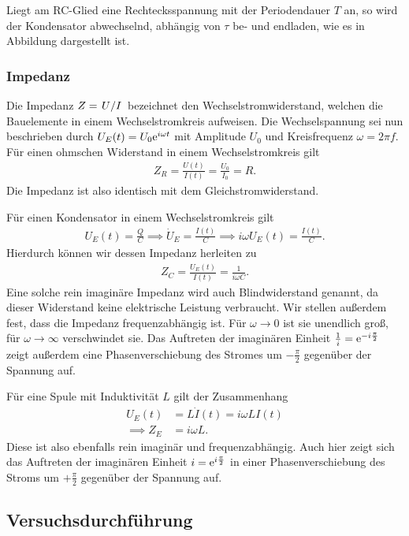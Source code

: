 Liegt am RC-Glied eine Rechtecksspannung mit der Periodendauer $T$ an, so wird der Kondensator abwechselnd, abhängig von $\tau$ be- und endladen, wie es in Abbildung  dargestellt ist.

\subsubsection*{Impedanz}
Die Impedanz $Z = \ffrac{U}{I}$ bezeichnet den Wechselstromwiderstand, welchen die Bauelemente in einem Wechselstromkreis aufweisen. Die Wechselspannung sei nun beschrieben durch $U_E(t) = U_0\text{e}^{i \omega t}$ mit Amplitude $U_0$ und Kreisfrequenz $\omega = 2\pi f$. Für einen ohmschen Widerstand in einem Wechselstromkreis gilt
\begin{align}
  Z_R = \frac{U(t)}{I(t)} = \frac{U_0}{I_0} = R.
\end{align}
Die Impedanz ist also identisch mit dem Gleichstromwiderstand. 

Für einen Kondensator in einem Wechselstromkreis gilt
\begin{align}
  U_E(t) = \frac{Q}{C} \implies \dot{U}_E = \frac{I(t)}{C} \implies i \omega U_E(t) = \frac{I(t)}{C}.
\end{align}
Hierdurch können wir dessen Impedanz herleiten zu
\begin{align}
  Z_C = \frac{U_E(t)}{I(t)} = \frac{1}{i \omega C}.
\end{align}
Eine solche rein imaginäre Impedanz wird auch Blindwiderstand genannt, da dieser Widerstand keine elektrische Leistung verbraucht. Wir stellen außerdem fest, dass die Impedanz frequenzabhängig ist. Für $\omega \to 0$ ist sie unendlich groß, für $\omega \to \infty$ verschwindet sie. Das Auftreten der imaginären Einheit $\frac{1}{i} = \text{e}^{-i \frac{\pi}{2}}$ zeigt außerdem eine Phasenverschiebung des Stromes um $-\frac{\pi}{2}$ gegenüber der Spannung auf.

Für eine Spule mit Induktivität $L$ gilt der Zusammenhang
\begin{align}
  U_E(t) &= L \dot{I}(t) = i\omega LI(t)\\
  \implies Z_E &= i \omega L.
\end{align}
Diese ist also ebenfalls rein imaginär und frequenzabhängig. Auch hier zeigt sich das Auftreten der imaginären Einheit $i = \text{e}^{i\frac{\pi}{2}}$ in einer Phasenverschiebung des Stroms um $+\frac{\pi}{2}$ gegenüber der Spannung auf.

\subsection{Versuchsdurchführung}